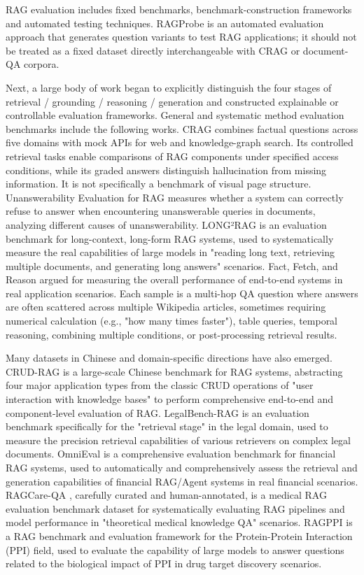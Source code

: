 RAG evaluation includes fixed benchmarks, benchmark-construction frameworks and automated testing techniques. RAGProbe \cite{ragprobe2023} is an automated evaluation approach that generates question variants to test RAG applications; it should not be treated as a fixed dataset directly interchangeable with CRAG or document-QA corpora.

Next, a large body of work began to explicitly distinguish the four stages of retrieval / grounding / reasoning / generation and constructed explainable or controllable evaluation frameworks. General and systematic method evaluation benchmarks include the following works. CRAG \cite{crag2024} combines factual questions across five domains with mock APIs for web and knowledge-graph search. Its controlled retrieval tasks enable comparisons of RAG components under specified access conditions, while its graded answers distinguish hallucination from missing information. It is not specifically a benchmark of visual page structure. Unanswerability Evaluation for RAG \cite{unanswerablerag2024} measures whether a system can correctly refuse to answer when encountering unanswerable queries in documents, analyzing different causes of unanswerability. LONG²RAG \cite{long2rag2024} is an evaluation benchmark for long-context, long-form RAG systems, used to systematically measure the real capabilities of large models in "reading long text, retrieving multiple documents, and generating long answers" scenarios. Fact, Fetch, and Reason \cite{factfetchreason2024} argued for measuring the overall performance of end-to-end systems in real application scenarios. Each sample is a multi-hop QA question where answers are often scattered across multiple Wikipedia articles, sometimes requiring numerical calculation (e.g., "how many times faster"), table queries, temporal reasoning, combining multiple conditions, or post-processing retrieval results.

Many datasets in Chinese and domain-specific directions have also emerged. CRUD-RAG \cite{crudrag2024} is a large-scale Chinese benchmark for RAG systems, abstracting four major application types from the classic CRUD operations of "user interaction with knowledge bases" to perform comprehensive end-to-end and component-level evaluation of RAG. LegalBench-RAG \cite{legalbenchragr2024} is an evaluation benchmark specifically for the "retrieval stage" in the legal domain, used to measure the precision retrieval capabilities of various retrievers on complex legal documents. OmniEval \cite{omnieval2024} is a comprehensive evaluation benchmark for financial RAG systems, used to automatically and comprehensively assess the retrieval and generation capabilities of financial RAG/Agent systems in real financial scenarios. RAGCare-QA \cite{ragcareqa2025}, carefully curated and human-annotated, is a medical RAG evaluation benchmark dataset for systematically evaluating RAG pipelines and model performance in "theoretical medical knowledge QA" scenarios. RAGPPI \cite{ragppi2024} is a RAG benchmark and evaluation framework for the Protein-Protein Interaction (PPI) field, used to evaluate the capability of large models to answer questions related to the biological impact of PPI in drug target discovery scenarios.

